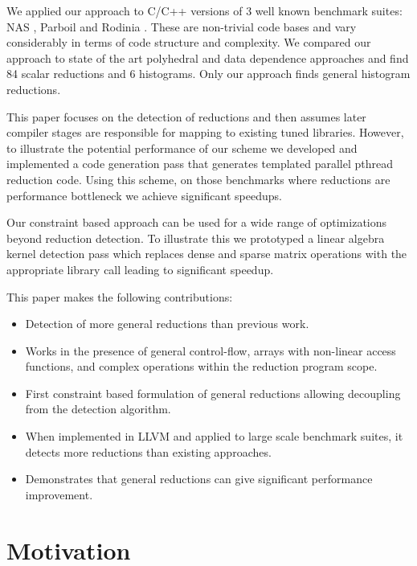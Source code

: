     We applied our approach to C/C++ versions of 3 well known benchmark
    suites: NAS \cite{seo2011performance},
    Parboil\cite{stratton2012parboil} and
    Rodinia \cite{Che2009Rodinia}. These are non-trivial code bases and
    vary considerably in terms of code structure and complexity. We
    compared our approach to state of the art polyhedral and data
    dependence approaches and find 84 scalar reductions and 6
    histograms. Only our approach finds general histogram reductions.

    This paper focuses on the detection of reductions and then assumes
     later compiler stages are responsible for mapping to existing tuned
     libraries. However, to illustrate the potential performance of our
     scheme we developed and implemented a code generation pass that
     generates templated parallel pthread reduction code. Using this
     scheme, on those benchmarks where reductions are 
     performance bottleneck we achieve significant  speedups.
     

 Our constraint based approach can be used for a wide range of optimizations 
beyond reduction detection. To illustrate this we prototyped a linear algebra kernel detection pass which replaces dense and sparse matrix operations with the appropriate library call leading to significant speedup.

This paper makes the following contributions:

\begin{itemize}
\item Detection of more general reductions than  previous work. 
\item Works in the presence of general control-flow, arrays with non-linear access functions, and complex operations within the reduction program scope.
\item First constraint based formulation of general reductions allowing decoupling from the 
detection algorithm.
\item When implemented in LLVM and applied to large scale benchmark suites, it  detects more  reductions than existing approaches.
\item Demonstrates that general reductions can give significant performance improvement.  
\end{itemize}

\section{Motivation}

